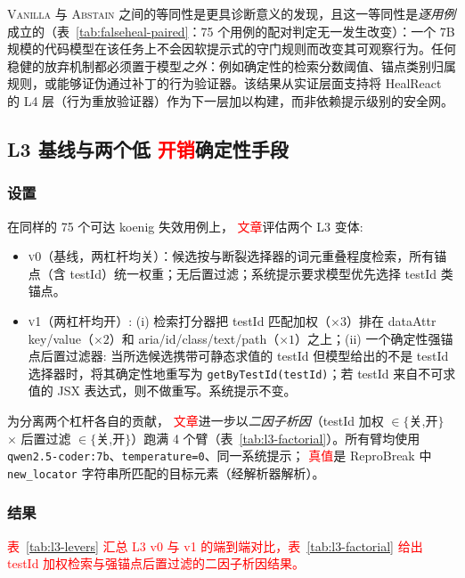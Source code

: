 \documentclass[UTF8, a4paper, 10.5pt, twocolumn, fontset=none]{ctexart}
\providecommand{\DIFaddbegin}{} %
\providecommand{\DIFaddend}{} %
\providecommand{\DIFaddtex}[1]{\textcolor{red}{#1}} %
\providecommand{\DIFadd}[1]{\texorpdfstring{\DIFaddtex{#1}}{#1}} %
\providecommand{\DIFaddincludegraphics}[2][]{{\color{blue}\fbox{\DIFOincludegraphics[#1]{#2}}}} %
\DeclareRobustCommand{\DIFaddbegin}{\DIFOaddbegin \let\includegraphics\DIFaddincludegraphics} %
\DeclareRobustCommand{\DIFaddend}{\DIFOaddend \let\includegraphics\DIFOincludegraphics} %
\begin{document}
\textsc{Vanilla} 与 \textsc{Abstain} 之间的等同性是更具诊断意义的发现，且这一等同性是\emph{逐用例}成立的（表~\ref{tab:falseheal-paired}：75 个用例的配对判定无一发生改变）：一个 7B 规模的代码模型在该任务上不会因软提示式的守门规则而改变其可观察行为。任何稳健的放弃机制都必须置于模型\emph{之外}：例如确定性的检索分数阈值、锚点类别归属规则，或能够证伪通过补丁的行为验证器。该结果从实证层面支持将 HealReact 的 L4 层（行为重放验证器）作为下一层加以构建，而非依赖提示级别的安全网。

\subsection{ L3 基线与两个低 \DIFaddbegin \DIFadd{开销}\DIFaddend 确定性手段}
\label{sec:f2}

\subsubsection{设置}
在同样的 75 个可达 koenig 失效用例上， \DIFaddbegin \DIFadd{文章}\DIFaddend 评估两个 L3 变体:
\begin{itemize}
\item \textsc{v0（基线，两杠杆均关）}：候选按与断裂选择器的词元重叠程度检索，所有锚点（含 testId）统一权重；无后置过滤；系统提示要求模型优先选择 testId 类锚点。
\item \textsc{v1（两杠杆均开）}: (i) 检索打分器把 testId 匹配加权（$\times 3$）排在 dataAttr key/value（$\times 2$）和 aria/id/class/text/path（$\times 1$）之上；(ii) 一个确定性强锚点后置过滤器: 当所选候选携带可静态求值的 testId 但模型给出的不是 testId 选择器时，将其确定性地重写为 \texttt{getByTestId(testId)}；若 testId 来自不可求值的 JSX 表达式，则不做重写。系统提示不变。
\end{itemize}

为分离两个杠杆各自的贡献， \DIFaddbegin \DIFadd{文章}\DIFaddend 进一步以\emph{二因子析因}（testId 加权 $\in\{$关,开$\}$ $\times$ 后置过滤 $\in\{$关,开$\}$）跑满 4 个臂（表~\ref{tab:l3-factorial}）。所有臂均使用 \texttt{qwen2.5-coder:7b}、\texttt{temperature=0}、同一系统提示； \DIFaddbegin \DIFadd{真值}\DIFaddend 是 ReproBreak 中 \texttt{new\_locator} 字符串所匹配的目标元素（经解析器解析）。

\subsubsection{结果}
 \DIFaddbegin \DIFadd{表~\ref{tab:l3-levers} 汇总 L3 v0 与 v1 的端到端对比，表~\ref{tab:l3-factorial} 给出 testId 加权检索与强锚点后置过滤的二因子析因结果。
}
\end{document}
